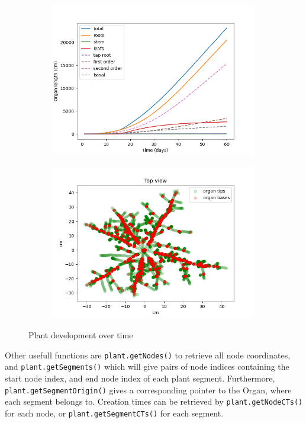 \begin{figure}
\begin{subfigure}[c]{0.5\textwidth}
\includegraphics[width=0.99\textwidth]{figures/topics_development.png}
 \label{fig:topics_development}
\end{subfigure} 
\begin{subfigure}[c]{0.5\textwidth}
\includegraphics[width=0.99\textwidth]{figures/topics_development2.png}
 \label{fig:topics_development2}
\end{subfigure}
\caption{Plant development over time} 
\end{figure}

Other usefull functions are \texttt{plant.getNodes()} to retrieve all node coordinates, and \texttt{plant.getSegments()} which will give pairs of node indices containing the start node index, and end node index of each plant segment. Furthermore, \texttt{plant.getSegmentOrigin()} gives a corresponding pointer to the Organ, where each segment belongs to. Creation times can be retrieved by \texttt{plant.getNodeCTs()} for each node, or \texttt{plant.getSegmentCTs()} for each segment.
